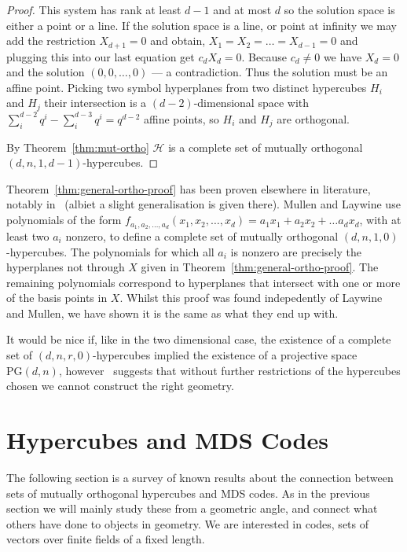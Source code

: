 \documentclass{article}
\newcommand{\PG}{\mathrm{PG}}
\begin{document}
\begin{proof}
  This system has rank at least \(d - 1\) and at most \(d\) so the solution space is either a point or a line. If the solution space is a line, or point at infinity we may add the restriction \(X_{d + 1} = 0\) and obtain,
  \(X_1 = X_2 = \ldots = X_{d - 1} = 0\) and plugging this into our last equation get \(c_d X_d = 0\). Because \(c_d \neq 0\) we have \(X_d = 0\) and the solution \((0, 0, \ldots, 0)\) --- a contradiction. Thus the solution must be an affine point.
  Picking two symbol hyperplanes from two distinct hypercubes \(H_{i}\) and \(H_{j}\) their intersection is a \((d - 2)\)-dimensional space with \(\sum_i^{d - 2} q^{i} - \sum_i^{d - 3} q^{i} = q^{d - 2}\) affine points, so \(H_{i}\) and \(H_{j}\) are orthogonal.

  By Theorem~\ref{thm:mut-ortho} \(\mathcal{H}\) is a complete set of mutually orthogonal \((d, n, 1, d - 1)\)-hypercubes.
\end{proof}


Theorem~\ref{thm:general-ortho-proof} has been proven elsewhere in literature, notably in~\cite{laywine1998discrete} (albiet a slight generalisation is given there). Mullen and Laywine use polynomials of the form \(f_{a_1, a_2, \ldots, a_d}(x_1, x_2, \ldots, x_d) = a_1x_1 + a_2x_2 + \ldots a_d x_d\), with at least two \(a_i\) nonzero, to define a complete set of mutually orthogonal \((d, n, 1, 0)\)-hypercubes.
The polynomials for which all \(a_i\) is nonzero are precisely the hyperplanes not through \(X\) given in Theorem~\ref{thm:general-ortho-proof}. The remaining polynomials correspond to hyperplanes that intersect with one or more of the basis points in \(X\). Whilst this proof was found indepedently of Laywine and Mullen,
we have shown it is the same as what they end up with.

It would be nice if, like in the two dimensional case, the existence of a complete set of \((d,n,r,0)\)-hypercubes implied the existence of a projective space \(\PG(d, n)\), 
however~\cite{morgan2000affine} suggests that without further restrictions of the hypercubes chosen we cannot construct the right geometry.


\section{Hypercubes and MDS Codes}

The following section is a survey of known results about the connection between sets of mutually orthogonal hypercubes and MDS codes. As in the previous section we will mainly study these from a geometric angle, and connect what others have done to objects in geometry.
We are interested in codes, sets of vectors over finite fields of a fixed length.
\end{document}
